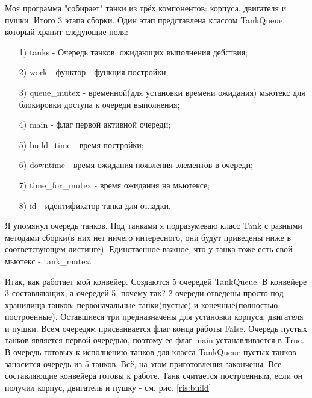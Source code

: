 \documentclass[a4paper, 14pt]{article}
\begin{document}
\hspace{1cm} Моя программа "собирает" танки из трёх компонентов: корпуса, двигателя и пушки. Итого 3 этапа сборки. Один этап представлена классом TankQueue, который хранит следующие поля:
	\begin{enumerate}
	\item[1)] tanks - Очередь танков, ожидающих выполнения действия;
    \item[2)] work - функтор - функция постройки;
    \item[3)] queue\_mutex - временной(для установки времени ожидания) мьютекс для блокировки доступа к очереди выполнения;
    \item[4)] main - флаг первой активной очереди;
    \item[5)] build\_time - время постройки;
    \item[6)] downtime - время ожидания появления элементов в очереди;
    \item[7)] time\_for\_mutex - время ожидания на мьютексе;
    \item[8)] id - идентификатор танка для отладки.
    \end{enumerate}
    
    Я упомянул очередь танков. Под танками я подразумеваю класс Tank с разными методами сборки(в них нет ничего интересного, они будут приведены ниже в соответсвующем листинге). Единственное важное, что у танка тоже есть свой мьютекс - tank\_mutex.
    
    Итак, как работает мой конвейер. Создаются 5 очередей TankQueue. В конвейере 3 составляющих, а очередей 5, почему так? 2 очереди отведены просто под хранилища танков: первоначальные танки(пустые) и конечные(полностью построенные). Оставшиеся три предназначены для установки корпуса, двигателя и пушки. Всем очередям присваивается флаг конца работы False. Очередь пустых танков является первой очередью, поэтому ее флаг main устанавливается в True. В очередь готовых к исполнению танков для класса TankQueue пустых танков заносится очередь из 5 танков. Всё, на этом приготовления закончены. Все составляющие конвейера готовы к работе. Танк считается построенным, если он получил корпус, двигатель и пушку - см. рис. \ref{ris:build}
    
\end{document}
